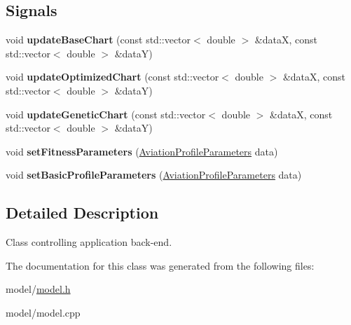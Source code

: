 \subsection*{Signals}
\begin{DoxyCompactItemize}
\item 
\hypertarget{class_model_aaafc71e874110691200a3669d7e2de09}{}\label{class_model_aaafc71e874110691200a3669d7e2de09} 
void {\bfseries update\+Base\+Chart} (const std\+::vector$<$ double $>$ \&dataX, const std\+::vector$<$ double $>$ \&dataY)
\item 
\hypertarget{class_model_a75de03d87bf729d8204c303d1b465db6}{}\label{class_model_a75de03d87bf729d8204c303d1b465db6} 
void {\bfseries update\+Optimized\+Chart} (const std\+::vector$<$ double $>$ \&dataX, const std\+::vector$<$ double $>$ \&dataY)
\item 
\hypertarget{class_model_a054ed50fcc64d1d202e9e12acb1654b1}{}\label{class_model_a054ed50fcc64d1d202e9e12acb1654b1} 
void {\bfseries update\+Genetic\+Chart} (const std\+::vector$<$ double $>$ \&dataX, const std\+::vector$<$ double $>$ \&dataY)
\item 
\hypertarget{class_model_afbde50de7b8ca6bdeeb169605fa144f4}{}\label{class_model_afbde50de7b8ca6bdeeb169605fa144f4} 
void {\bfseries set\+Fitness\+Parameters} (\hyperlink{struct_aviation_profile_parameters}{Aviation\+Profile\+Parameters} data)
\item 
\hypertarget{class_model_a5dd37391b4c2efe80fa29ab7f84157aa}{}\label{class_model_a5dd37391b4c2efe80fa29ab7f84157aa} 
void {\bfseries set\+Basic\+Profile\+Parameters} (\hyperlink{struct_aviation_profile_parameters}{Aviation\+Profile\+Parameters} data)
\end{DoxyCompactItemize}


\subsection{Detailed Description}
Class controlling application back-\/end. 

The documentation for this class was generated from the following files\+:\begin{DoxyCompactItemize}
\item 
model/\hyperlink{model_8h}{model.\+h}\item 
model/model.\+cpp\end{DoxyCompactItemize}
